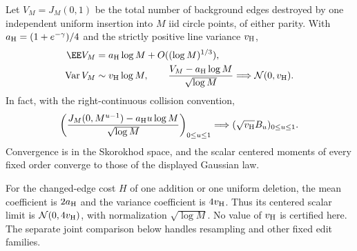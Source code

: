\documentclass[11pt,letterpaper]{article}
\begin{document}
\begin{theorem}
\label{thm:finite-one-history-CLT}
Let $V_M=J_M(0,1)$ be the total number of background edges destroyed
by one independent uniform insertion into $M$ iid circle points,
of either parity. With $a_{\rm H}=(1+e^{-\gamma})/4$ and the strictly
positive line variance $v_{\rm H}$,
\begin{align}
 \EE V_M&=a_{\rm H}\log M+O((\log M)^{1/3}),
                                      \label{eq:finite-capture-mean-rate}\\
 \operatorname{Var}V_M&\sim v_{\rm H}\log M,\qquad
 \frac{V_M-a_{\rm H}\log M}{\sqrt{\log M}}
       \Longrightarrow\mathcal N(0,v_{\rm H}).
                                      \label{eq:finite-capture-CLT}
\end{align}
In fact, with the right-continuous collision convention,
\begin{equation}\label{eq:finite-capture-FCLT}
 \left(\frac{J_M(0,M^{u-1})-a_{\rm H}u\log M}{\sqrt{\log M}}
                  \right)_{0\le u\le1}
       \Longrightarrow (\sqrt{v_{\rm H}}B_u)_{0\le u\le1}.
\end{equation}
Convergence is in the Skorokhod space, and the scalar centered
moments of every fixed order converge to those of the displayed
Gaussian law.

For the changed-edge cost $H$ of one addition or one uniform
deletion, the mean coefficient is $2a_{\rm H}$ and the variance
coefficient is $4v_{\rm H}$. Thus its centered scalar limit is
$\mathcal N(0,4v_{\rm H})$, with normalization $\sqrt{\log M}$.
No value of $v_{\rm H}$ is certified here. The separate joint
comparison below handles resampling and other fixed edit families.
\end{theorem}
\end{document}
